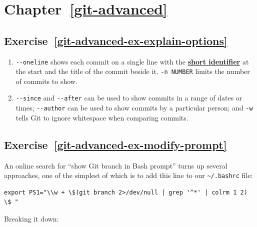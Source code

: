 \documentclass[
]{krantz}
\newcommand{\gref}[2]{\hyperlink{#2}{\textbf{#1}}}
\begin{document}
\hypertarget{chapter-refgit-advanced}{%
\section*{Chapter~\ref{git-advanced}}\label{chapter-refgit-advanced}}

\hypertarget{exercise-refgit-advanced-ex-explain-options}{%
\subsection*{Exercise~\ref{git-advanced-ex-explain-options}}\label{exercise-refgit-advanced-ex-explain-options}}


\begin{enumerate}
\def\labelenumi{\arabic{enumi}.}
\item
  \texttt{-\/-oneline} shows each commit on a single line
  with the \gref{short identifier}{short\_identifier\_git} at the start
  and the title of the commit beside it.
  \texttt{-n\ NUMBER} limits the number of commits to show.
\item
  \texttt{-\/-since} and \texttt{-\/-after} can be used to show commits
  in a range of dates or times;
  \texttt{-\/-author} can be used to show commits by a particular person;
  and \texttt{-w} tells Git to ignore whitespace when comparing commits.
\end{enumerate}

\hypertarget{exercise-refgit-advanced-ex-modify-prompt}{%
\subsection*{Exercise~\ref{git-advanced-ex-modify-prompt}}\label{exercise-refgit-advanced-ex-modify-prompt}}


An online search for ``show Git branch in Bash prompt'' turns up several approaches,
one of the simplest of which is to add this line to our \texttt{\textasciitilde{}/.bashrc} file:

\begin{verbatim}
export PS1="\\w + \$(git branch 2>/dev/null | grep '^*' | colrm 1 2) \$ "
\end{verbatim}

Breaking it down:
\end{document}
